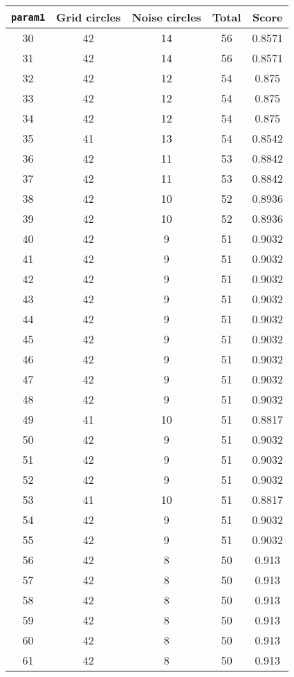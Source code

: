 \documentclass[letterpaper, 12pt]{article}
\begin{document}
\begin{longtable}{|c|c|c|c|c|}
\hline
\textbf{\texttt{param1}} & \textbf{Grid circles} & \textbf{Noise circles} & \textbf{Total} & \textbf{Score} \\
\hline
30 & 42 & 14 & 56 & 0.8571 \\
\hline
31 & 42 & 14 & 56 & 0.8571 \\
\hline
32 & 42 & 12 & 54 & 0.875 \\
\hline
33 & 42 & 12 & 54 & 0.875 \\
\hline
34 & 42 & 12 & 54 & 0.875 \\
\hline
35 & 41 & 13 & 54 & 0.8542 \\
\hline
36 & 42 & 11 & 53 & 0.8842 \\
\hline
37 & 42 & 11 & 53 & 0.8842 \\
\hline
38 & 42 & 10 & 52 & 0.8936 \\
\hline
39 & 42 & 10 & 52 & 0.8936 \\
\hline
40 & 42 & 9 & 51 & 0.9032 \\
\hline
41 & 42 & 9 & 51 & 0.9032 \\
\hline
42 & 42 & 9 & 51 & 0.9032 \\
\hline
43 & 42 & 9 & 51 & 0.9032 \\
\hline
44 & 42 & 9 & 51 & 0.9032 \\
\hline
45 & 42 & 9 & 51 & 0.9032 \\
\hline
46 & 42 & 9 & 51 & 0.9032 \\
\hline
47 & 42 & 9 & 51 & 0.9032 \\
\hline
48 & 42 & 9 & 51 & 0.9032 \\
\hline
49 & 41 & 10 & 51 & 0.8817 \\
\hline
50 & 42 & 9 & 51 & 0.9032 \\
\hline
51 & 42 & 9 & 51 & 0.9032 \\
\hline
52 & 42 & 9 & 51 & 0.9032 \\
\hline
53 & 41 & 10 & 51 & 0.8817 \\
\hline
54 & 42 & 9 & 51 & 0.9032 \\
\hline
55 & 42 & 9 & 51 & 0.9032 \\
\hline
56 & 42 & 8 & 50 & 0.913 \\
\hline
57 & 42 & 8 & 50 & 0.913 \\
\hline
58 & 42 & 8 & 50 & 0.913 \\
\hline
59 & 42 & 8 & 50 & 0.913 \\
\hline
60 & 42 & 8 & 50 & 0.913 \\
\hline
61 & 42 & 8 & 50 & 0.913 \\

\end{longtable}
\end{document}
